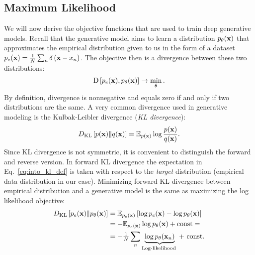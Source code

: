 \subsection{Maximum Likelihood}
We will now derive the objective functions that are used to train deep generative models. 
Recall that the generative model aims to learn a distribution $p_{\theta}({\mathbf{x}})$ that approximates the empirical distribution given to us in the form of a dataset $p_e({\mathbf{x}}) = \frac1N \sum_n \delta\left({\mathbf{x}} - x_n\right)$. 
The objective then is a divergence between these two distributions:
\begin{equation}\label{eq:intro_divergence}
\begin{aligned}
\text{D}\left[p_{e}(\rvx), p_{\theta}(\rvx)\right] \rightarrow \min_{\theta}.
\end{aligned}
\end{equation} 
By definition, divergence is nonnegative and equals zero if and only if two distributions are the same. 
A very common divergence used in generative modeling is the Kulbak-Leibler divergence (\textit{KL divergence}):
\begin{equation}
\begin{aligned} \label{eq:into_kl_def}
 \KL{p(\rvx)}{q(\rvx)} = \E_{p(\rvx)} \log \frac{p(\rvx)}{q(\rvx)}.
\end{aligned}
\end{equation}
\newline
Since KL divergence is not symmetric, it is convenient to distinguish the forward and reverse version. In forward KL divergence the expectation in Eq.~\ref{eq:into_kl_def} is taken with respect to the \textit{target} distribution (empirical data distribution in our case). Minimizing forward KL divergence between empirical distribution and a generative model is the same as maximizing the log likelihood objective:
\begin{equation}
\begin{aligned}
D_{\mathrm{KL}}\left[p_{e}({\mathbf{x}})\|p_{\theta}({\mathbf{x}})\right] & =  \mathbb{E}_{p_{e}({\mathbf{x}})}\left[ \log p_{e}({\mathbf{x}}) - \log p_{\theta}({\mathbf{x}})\right] \\
& =  - \mathbb{E}_{p_{e}({\mathbf{x}})} \log p_{\theta}({\mathbf{x}}) + \text{const}=\\
& =  - \tfrac1N \sum_n \underbrace{\log p_{\theta}({\mathbf{x}}_n)}_{\text{Log-likelihood }}  + \text{ const}.
\end{aligned}
\end{equation}
